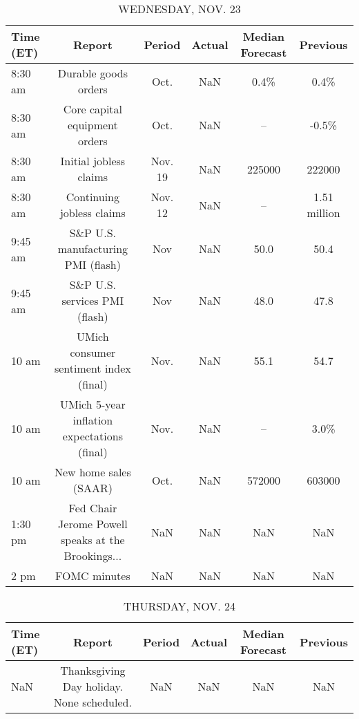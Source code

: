 \documentclass{article}%
\begin{document}
\begin{table}[htbp]%
\caption{WEDNESDAY, NOV. 23}%
\centering%
\begin{adjustbox}{width=1\textwidth}%
\begin{tabular}{lccccc}
\toprule
Time (ET) &                                             Report &  Period & Actual & Median Forecast &     Previous \\
\midrule
  8:30 am &                               Durable goods orders &    Oct. &    NaN &            0.4\% &         0.4\% \\
  8:30 am &                      Core capital equipment orders &    Oct. &    NaN &              -- &        -0.5\% \\
  8:30 am &                             Initial jobless claims & Nov. 19 &    NaN &          225000 &       222000 \\
  8:30 am &                          Continuing jobless claims & Nov. 12 &    NaN &              -- & 1.51 million \\
  9:45 am &                 S\&P U.S. manufacturing PMI (flash) &     Nov &    NaN &            50.0 &         50.4 \\
  9:45 am &                      S\&P U.S. services PMI (flash) &     Nov &    NaN &            48.0 &         47.8 \\
    10 am &             UMich consumer sentiment index (final) &    Nov. &    NaN &            55.1 &         54.7 \\
    10 am &        UMich 5-year inflation expectations (final) &    Nov. &    NaN &              -- &         3.0\% \\
    10 am &                              New home sales (SAAR) &    Oct. &    NaN &          572000 &       603000 \\
  1:30 pm & Fed Chair Jerome Powell speaks at the Brookings... &     NaN &    NaN &             NaN &          NaN \\
     2 pm &                                       FOMC minutes &     NaN &    NaN &             NaN &          NaN \\
\bottomrule
\end{tabular}
%
\end{adjustbox}%
\end{table}

%


\begin{table}[htbp]%
\caption{THURSDAY, NOV. 24}%
\centering%
\begin{adjustbox}{width=1\textwidth}%
\begin{tabular}{lccccc}
\toprule
Time (ET) &                                    Report & Period & Actual & Median Forecast & Previous \\
\midrule
      NaN & Thanksgiving Day holiday. None scheduled. &    NaN &    NaN &             NaN &      NaN \\
\bottomrule
\end{tabular}
%
\end{adjustbox}%
\end{table}
\end{document}
